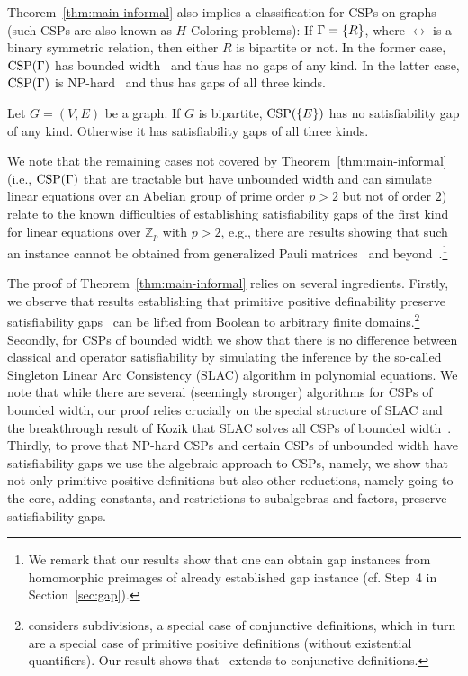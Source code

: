 Theorem~\ref{thm:main-informal} also implies
a classification for CSPs on graphs (such CSPs are also known as $H$-Coloring problems): If $\Gamma=\{R\}$, where $\rel$ is a binary
symmetric relation, then either $R$ is bipartite or not. In the former case,
${\rm CSP}(\Gamma)$ has bounded width~\cite{Bulatov18:survey} and thus has no gaps of any kind. In the latter
case, ${\rm CSP}(\Gamma)$ is NP-hard~\cite{HellN90,Bulatov05:tcs} and thus has gaps of
all three kinds.

\begin{corollary}\label{cor:graphs}
Let $G=(V,E)$ be a graph. If $G$ is bipartite, ${\rm CSP}(\{E\})$ has no satisfiability gap of any kind. Otherwise it has satisfiability gaps of all three kinds.
\end{corollary}

We note that the remaining cases not covered by Theorem~\ref{thm:main-informal}
(i.e., ${\rm CSP}(\Gamma)$ that are tractable but have unbounded width and can simulate
linear equations over an Abelian group of prime order $p>2$ but not of order
$2$) relate to the known difficulties of establishing satisfiability gaps of the
first kind for linear equations over $\mathbb{Z}_p$ with $p>2$, e.g., there are
results showing that such an instance cannot be obtained from generalized Pauli
matrices~\cite{Qassim20:jpa} and beyond~\cite{Frembs22:arxiv}.\footnote{We
remark that our results show that one can obtain gap instances from homomorphic
preimages of already established gap instance (cf. Step~4 in
Section~\ref{sec:gap}).}

\medskip
The proof of Theorem~\ref{thm:main-informal} relies on several ingredients. Firstly, we observe that
results establishing that primitive positive definability preserve
satisfiability gaps~\cite{AKS19:jcss} can be lifted from Boolean to arbitrary finite
domains.\footnote{\cite[Theorem~6.4]{Mastel24:stoc} considers subdivisions, a
special case of conjunctive definitions, which in turn are a special case of
primitive positive definitions (without existential quantifiers). Our result
shows that~\cite[Theorem~6.4]{Mastel24:stoc} extends to conjunctive
definitions.}
%
Secondly, for CSPs of bounded width we show that there is no difference
between classical and operator satisfiability by simulating the inference by the
so-called Singleton Linear Arc Consistency (SLAC) algorithm in polynomial
equations. We note that while there are several (seemingly stronger) algorithms
for CSPs of bounded width, our proof relies crucially on the special structure of SLAC and
the breakthrough result of Kozik that SLAC solves all CSPs of bounded
width~\cite{Kozik21:sicomp}. Thirdly, to prove that NP-hard CSPs and certain CSPs of unbounded width have
satisfiability gaps we use the algebraic approach to CSPs, namely, we show that not
only primitive positive definitions but also other reductions,
namely going to the core, adding constants, and restrictions to subalgebras and
factors, preserve satisfiability gaps.

